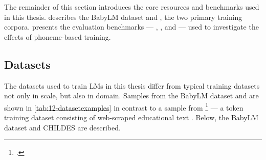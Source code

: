 The remainder of this section introduces the core resources and benchmarks used in this thesis.  describes the BabyLM dataset and \childes, the two primary training corpora.  presents the evaluation benchmarks --- \blimp, \glue, and \babyslm --- used to investigate the effects of phoneme-based training.



\subsection{Datasets}\label{sec:12-datasets}

The datasets used to train LMs in this thesis differ from typical training datasets not only in scale, but also in domain. Samples from the BabyLM dataset and \childes are shown in \cref{tab:12-datasetexamples} in contrast to a sample from \fineweb\footnote{\href{https://huggingface.co/datasets/HuggingFaceFW/fineweb-edu}{}.} --- a  token training dataset consisting of web-scraped educational text \citep{penedo2024finewebdatasetsdecantingweb}. Below, the BabyLM dataset and CHILDES are described.

